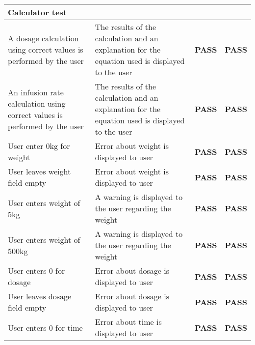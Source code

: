 \documentclass[11pt,fleqn,twoside]{article}
\begin{document}
\begin{center}
\begin{longtable}{| p{5cm} | p{5cm} | c | c |}
\textbf{Calculator test}                                                   &                                                                                                  & \textbf{}             & \textbf{}              \\ \hline
A dosage calculation using correct values is performed by the user         & The results of the calculation and an explanation for the equation used is displayed to the user & \textbf{PASS}         & \textbf{PASS}          \\ \hline
An infusion rate calculation using correct values is performed by the user & The results of the calculation and an explanation for the equation used is displayed to the user & \textbf{PASS}         & \textbf{PASS}          \\ \hline
User enter 0kg for weight                                                  & Error about weight is displayed to user                                                          & \textbf{PASS}         & \textbf{PASS}          \\ \hline
User leaves weight field empty                                             & Error about weight is displayed to user                                                          & \textbf{PASS}         & \textbf{PASS}          \\ \hline
User enters weight of 5kg                                                  & A warning is displayed to the user regarding the weight                                          & \textbf{PASS}         & \textbf{PASS}          \\ \hline
User enters weight of 500kg                                                & A warning is displayed to the user regarding the weight                                          & \textbf{PASS}         & \textbf{PASS}          \\ \hline
User enters 0 for dosage                                                   & Error about dosage is displayed to user                                                          & \textbf{PASS}         & \textbf{PASS}          \\ \hline
User leaves dosage field empty                                             & Error about dosage is displayed to user                                                          & \textbf{PASS}         & \textbf{PASS}          \\ \hline
User enters 0 for time                                                     & Error about time is displayed to user                                                            & \textbf{PASS}         & \textbf{PASS}          \\ \hline

\end{longtable}
\end{center}
\end{document}
